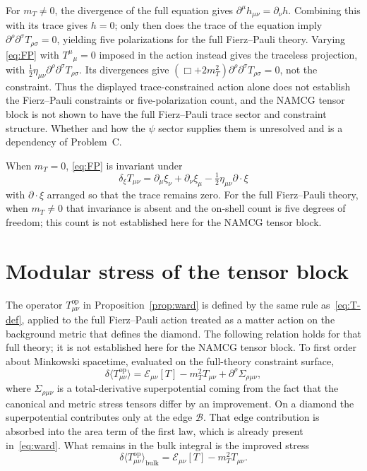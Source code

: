 For \(m_T\neq0\), the divergence of the full equation gives
\(\partial^\mu h_{\mu\nu}=\partial_\nu h\). Combining this with its
trace gives \(h=0\); only then does the trace of the equation imply
\(\partial^\rho\partial^\sigma T_{\rho\sigma}=0\), yielding five
polarizations for the full Fierz--Pauli theory. Varying
\eqref{eq:FP} with \(T^\mu{}_\mu=0\) imposed in the action instead
gives the traceless projection, with
\(\tfrac12\eta_{\mu\nu}\partial^\rho\partial^\sigma
T_{\rho\sigma}\). Its divergences give
\((\Box+2m_T^2)\partial^\rho\partial^\sigma T_{\rho\sigma}=0\),
not the constraint. Thus the displayed trace-constrained action alone
does not establish the Fierz--Pauli constraints or five-polarization
count, and the NAMCG tensor block is not shown to have the full
Fierz--Pauli trace sector and constraint structure. Whether and how
the \(\psi\) sector supplies them is unresolved and is a dependency of
Problem~C.

When \(m_T=0\), \eqref{eq:FP} is invariant under
\begin{equation}
  \label{eq:FP-gauge}
  \delta_\xi T_{\mu\nu}
  =\partial_\mu\xi_\nu+\partial_\nu\xi_\mu
   -\tfrac12\eta_{\mu\nu}\partial\cdot\xi
\end{equation}
with \(\partial\cdot\xi\) arranged so that the trace remains zero.
For the full Fierz--Pauli theory, when \(m_T\neq0\) that invariance is
absent and the on-shell count is five degrees of freedom; this count
is not established here for the NAMCG tensor block.

\section{Modular stress of the tensor block}
\label{sec:ch7-stress}

The operator \(T_{\mu\nu}^{\mathrm{op}}\) in
Proposition~\ref{prop:ward} is defined by the same rule
as~\eqref{eq:T-def}, applied to the full Fierz--Pauli action treated
as a matter action on the background metric that defines the diamond.
The following relation holds for that full theory; it is not
established here for the NAMCG tensor block. To first order about
Minkowski spacetime, evaluated on the full-theory constraint surface,
\begin{equation}
  \label{eq:Top-FP}
  \delta\langle T_{\mu\nu}^{\mathrm{op}}\rangle
  =\mathcal{E}_{\mu\nu}[T]-m_T^2 T_{\mu\nu}
   +\partial^\rho\Sigma_{\rho\mu\nu},
\end{equation}
where \(\Sigma_{\rho\mu\nu}\) is a total-derivative superpotential
coming from the fact that the canonical and metric stress tensors
differ by an improvement. On a diamond the superpotential
contributes only at the edge \(\mathcal{B}\). That edge contribution
is absorbed into the area term of the first law, which is already
present in~\eqref{eq:ward}. What remains in the bulk integral is
the improved stress
\begin{equation}
  \label{eq:Top-improved}
  \delta\langle T_{\mu\nu}^{\mathrm{op}}\rangle_{\mathrm{bulk}}
  =\mathcal{E}_{\mu\nu}[T]-m_T^2 T_{\mu\nu}.
\end{equation}

